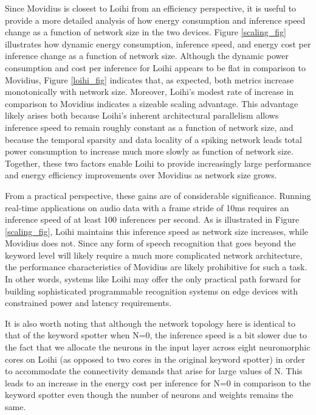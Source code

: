 \documentclass[sigconf, screen]{acmart}
\begin{document}
Since Movidius is closest to Loihi from an efficiency perspective, it is useful to provide a more detailed analysis of how energy consumption and inference speed change as a function of network size in the two devices. Figure \ref{scaling_fig} illustrates how dynamic energy consumption, inference speed, and energy cost per inference change as a function of network size. Although the dynamic power consumption and cost per inference for Loihi appears to be flat in comparison to Movidius, Figure \ref{loihi_fig} indicates that, as expected, both metrics increase monotonically with network size. Moreover, Loihi's modest rate of increase in comparison to Movidius indicates a sizeable scaling advantage. This advantage likely arises both because Loihi's inherent architectural parallelism allows inference speed to remain roughly constant as a function of network size, and because the temporal sparsity and data locality of a spiking network leads total power consumption to increase much more slowly as function of network size. Together, these two factors enable Loihi to provide increasingly large performance and energy efficiency improvements over Movidius as network size grows. 

From a practical perspective, these gains are of considerable significance. Running real-time applications on audio data with a frame stride of 10ms requires an inference speed of at least 100 inferences per second. As is illustrated in Figure \ref{scaling_fig}, Loihi maintains this inference speed as network size increases, while Movidius does not. Since any form of speech recognition that goes beyond the keyword level will likely require a much more complicated network architecture, the performance characteristics of Movidius are likely prohibitive for such a task. In other words, systems like Loihi may offer the only practical path forward for building sophisticated programmable recognition systems on edge devices with constrained power and latency requirements.

It is also worth noting that although the network topology here is identical to that of the keyword spotter when N=0, the inference speed is a bit slower due to the fact that we allocate the neurons in the input layer across eight neuromorphic cores on Loihi (as opposed to two cores in the original keyword spotter) in order to accommodate the connectivity demands that arise for large values of N. This leads to an increase in the energy cost per inference for N=0 in comparison to the keyword spotter even though the number of neurons and weights remains the same. 
\end{document}
